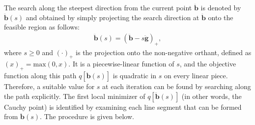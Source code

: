 \documentclass[11pt]{article}
\newcommand{\0}{\phantom{0}}
\begin{document}
The search along the steepest direction from the current point $\ddot{\bm{b}}$ is denoted by $\ddot{\bm{b}}(s)$ and obtained by simply projecting the search direction at $\ddot{\bm{b}}$ onto the feasible region as follows:
\begin{align*}
\ddot{\bm{b}}(s) = (\ddot{\bm{b}} - s\ddot{\bm{g}})_{+},
\end{align*}
where $s \geq 0$ and $(\cdot)_{+}$ is the projection onto the non-negative orthant, defined as $(x)_{+} = \text{max}(0, x)$. It is a piecewise-linear function of $s$, and the objective function along this path $q[\ddot{\bm{b}}(s)]$ is quadratic in $s$ on every linear piece. Therefore, a suitable value for $s$ at each iteration can be found by searching along the path explicitly. The first local minimizer of $q[\ddot{\bm{b}}(s)]$ (in other words, the Cauchy point) is identified by examining each line segment that can be formed from $\ddot{\bm{b}}(s)$. The procedure is given below.
\end{document}
